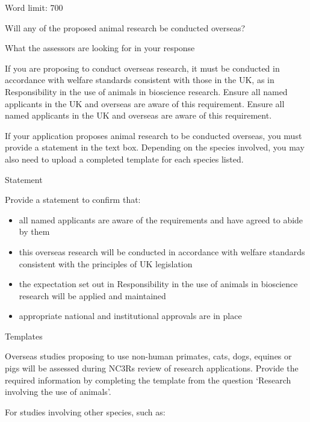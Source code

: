 \documentclass[11pt]{article}
\newenvironment{instruction}{%
    \begin{tcolorbox}[breakable,colback=red!5,colframe=red,title=Instruction]%
	}{%
    	\end{tcolorbox}%
	}
\begin{document}
\begin{instruction}

Word limit: 700

Will any of the proposed animal research be conducted overseas?

What the assessors are looking for in your response

If you are proposing to conduct overseas research, it must be conducted in
accordance with welfare standards consistent with those in the UK, as in
Responsibility in the use of animals in bioscience research. Ensure all
named applicants in the UK and overseas are aware of this requirement.
Ensure all named applicants in the UK and overseas are aware of this
requirement.

If your application proposes animal research to be conducted overseas, you
must provide a statement in the text box. Depending on the species involved,
you may also need to upload a completed template for each species listed.

Statement

Provide a statement to confirm that:

\begin{itemize}

	\item all named applicants are aware of the requirements and have agreed to
abide by them

	\item this overseas research will be conducted in accordance with welfare
standards consistent with the principles of UK legislation

	\item the expectation set out in Responsibility in the use of animals in bioscience
research will be applied and maintained

	\item appropriate national and institutional approvals are in place

\end{itemize}

Templates

Overseas studies proposing to use non-human primates, cats, dogs, equines or
pigs will be assessed during NC3Rs review of research applications. Provide
the required information by completing the template from the question
‘Research involving the use of animals’.

For studies involving other species, such as:

\begin{itemize}


\end{itemize}
\end{instruction}
\end{document}
